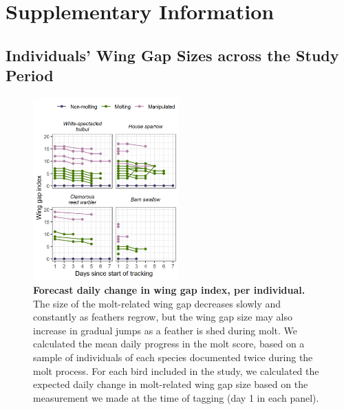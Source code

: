 { \begin{center}  \end{center} }

\newpage


\begingroup

\let\clearpage\relax
\let\cleardoublepage\relax
\let\cleardoublepage\relax

{\chapter*{Supplementary Information}}

\section*{Individuals' Wing Gap Sizes across the Study Period}

\begin{figure}[!ht]
    \centering
    \includegraphics[width=0.5\textwidth]{figures/holeybirds/fig_spm_01}
    \caption{
        \textbf{Forecast daily change in wing gap index, per individual.}
        The size of the molt-related wing gap decreases slowly and constantly as feathers regrow, but the wing gap size may also increase in gradual jumps as a feather is shed during molt.
        We calculated the mean daily progress in the molt score, based on a sample of individuals of each species documented twice during the molt process.
        For each bird included in the study, we calculated the expected daily change in molt-related wing gap size based on the measurement we made at the time of tagging (day 1 in each panel).
    }
    \label{fig:wgi-daily}
\end{figure}

